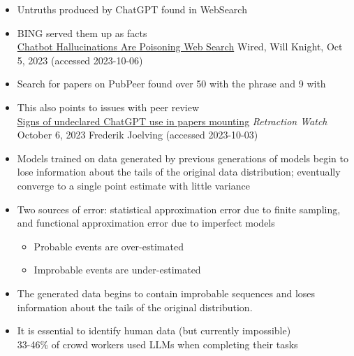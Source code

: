 \documentclass[25pt,a4paper,landscape,headrule,footrule,xetex]{foils}
\begin{document}
\begin{itemize}
\item Untruths produced by ChatGPT found in WebSearch
\item BING served them up as facts
  \\ {\small \href{https://www.wired.com/story/fast-forward-chatbot-hallucinations-are-poisoning-web-search/}{Chatbot Hallucinations Are Poisoning Web Search} Wired, Will Knight, Oct 5, 2023 (accessed 2023-10-06)}
\item Search for papers on PubPeer found over 50 with the phrase  and 9 with 
\item This also points to issues with peer review
  \\{\small 
\href{https://retractionwatch.com/2023/10/06/signs-of-undeclared-chatgpt-use-in-papers-mounting/}{Signs of undeclared ChatGPT use in papers mounting} \textit{Retraction Watch} October 6, 2023 Frederik Joelving (accessed 2023-10-03)}


\end{itemize}


\begin{itemize}\addtolength{\itemsep}{-1ex}
\item Models trained on data generated by previous generations of
  models begin to lose information about the tails of the original
  data distribution;  eventually converge to a single point estimate
  with little variance
\item Two sources of error: statistical
  approximation error due to finite sampling, and functional
  approximation error due to imperfect models
  \begin{itemize}
  \item  Probable events are over-estimated 
  \item Improbable events are under-estimated 
  \end{itemize}
\item The generated data begins to contain improbable sequences and
  loses information about the tails of the original distribution.
\item It is essential to identify human data (but currently impossible)
  \\ 33-46\% of crowd workers used LLMs when completing their tasks
\end{itemize}
\end{document}
